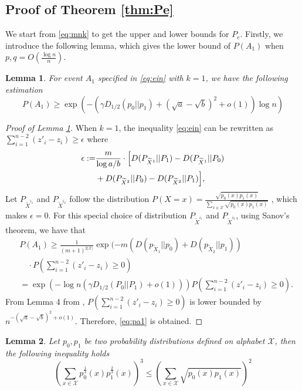 \documentclass[conference,letterpaper]{IEEEtran}
\newtheorem{lemma}{Lemma}
\begin{document}
\subsection{Proof of Theorem \ref{thm:Pe}}
We start from \eqref{eq:mnk} to get the upper and lower bounds for $P_e$.
Firstly, we introduce the following lemma, which gives the lower bound
of $P(A_1)$ when $p,q=O(\frac{\log n}{n})$.
\begin{lemma}\label{lem:single_lower}
For event $A_1$ specified in \eqref{eq:ein} with $k=1$,
we have the following estimation
\begin{equation}\label{eq:pa1}
P(A_1) \geq \exp(-(\gamma D_{1/2}(p_0||p_1) + (\sqrt{a}-\sqrt{b})^2 + o(1))\log n )
\end{equation}
\end{lemma}
\begin{proof}[Proof of Lemma \ref{lem:single_lower}] 
	When $k=1$,
	the inequality \eqref{eq:ein} can be rewritten as
	$\sum_{i=1}^{n-2} (z'_i - z_i) \geq \epsilon$
	where
	\begin{align*}
	\epsilon := &\frac{m}{\log a/b}\cdot \Bigl[D(P_{\widetilde{X}^{1}} || P_1) - D(P_{\widetilde{X}^{1}} || P_0) \\
	&+D(P_{\widetilde{X}^{2}} || P_0) - D(P_{\widetilde{X}^{2}} || P_1)\Bigr],
	\end{align*}
	Let $P_{\widetilde{X}^{i_1}}$ and $P_{\widetilde{X}^{i_2}}$ follow the distribution
	$P(X=x)=\frac{\sqrt{p_0(x)p_1(x)}}{ \sum_{x\in \mathcal{X}} \sqrt{p_0(x) p_1(x)}} $
	, which makes $\epsilon =0$.
	For this special choice of distribution
	$P_{\widetilde{X}^{i_1}}$ and $P_{\widetilde{X}^{i_2}}$,
	using Sanov's theorem, we have that
	\begin{align*}
	&P(A_1)
	\geq\frac{1}
	{(m+1)^{2|\mathcal{X}|}}
	\exp(-m(D(p_{\widetilde{X}_1} || p_0) + D(p_{\widetilde{X}_2} || p_1))\\
	&\quad\cdot P\left(\sum_{i=1}^{n-2} (z'_i - z_i) \geq 0\right)\\
	& = \exp(-\log n (\gamma D_{1/2}(P_0||P_1)+o(1))) P(\sum_{i=1}^{n-2} (z'_i - z_i) \geq 0).
	\end{align*}
	From Lemma 4 from \cite{abbe2015exact},
	$P(\sum_{i=1}^{n-2} (z'_i - z_i) \geq 0)$ is lower bounded by $n^{-(\sqrt{a} - \sqrt{b})^2 + o(1)}$.
	Therefore, \eqref{eq:pa1} is obtained.
\end{proof}
\begin{lemma}\label{lem:p0p1}
	Let $p_0,p_1$ be two probability distributions defined on alphabet $\mathcal{X}$,
	then the following inequality holds
	\begin{equation}\label{eq:32}
		\left(\sum_{x\in \mathcal{X}} p^{\frac{1}{3}}_0(x) p^{\frac{2}{3}}_1(x)\right)^3
		\leq \left(\sum_{x\in \mathcal{X}} \sqrt{p_0(x) p_1(x)}\right)^2
	\end{equation}
\end{lemma}
\end{document}
